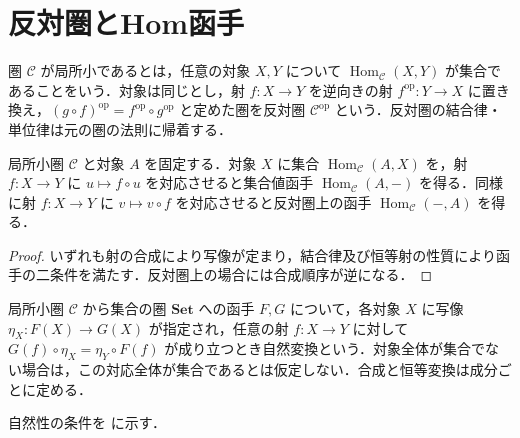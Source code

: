 \section{反対圏とHom函手}
\begin{defn}[局所小圏と反対圏]
圏 $\mathcal C$ が局所小であるとは，任意の対象 $X,Y$ について $\operatorname{Hom}_{\mathcal C}(X,Y)$ が集合であることをいう．対象は同じとし，射 $f:X\to Y$ を逆向きの射 $f^{\mathrm{op}}:Y\to X$ に置き換え，$(g\circ f)^{\mathrm{op}}=f^{\mathrm{op}}\circ g^{\mathrm{op}}$ と定めた圏を反対圏 $\mathcal C^{\mathrm{op}}$ という．反対圏の結合律・単位律は元の圏の法則に帰着する．
\end{defn}
\begin{prop}[Hom函手]
局所小圏 $\mathcal C$ と対象 $A$ を固定する．対象 $X$ に集合 $\operatorname{Hom}_{\mathcal C}(A,X)$ を，射 $f:X\to Y$ に $u\mapsto f\circ u$ を対応させると集合値函手 $\operatorname{Hom}_{\mathcal C}(A,-)$ を得る．同様に射 $f:X\to Y$ に $v\mapsto v\circ f$ を対応させると反対圏上の函手 $\operatorname{Hom}_{\mathcal C}(-,A)$ を得る．
\end{prop}
\begin{proof}
いずれも射の合成により写像が定まり，結合律及び恒等射の性質により函手の二条件を満たす．反対圏上の場合には合成順序が逆になる．
\end{proof}
\begin{defn}[集合値函手の自然変換]
局所小圏 $\mathcal C$ から集合の圏 $\mathbf{Set}$ への函手 $F,G$ について，各対象 $X$ に写像 $\eta_X:F(X)\to G(X)$ が指定され，任意の射 $f:X\to Y$ に対して $G(f)\circ\eta_X=\eta_Y\circ F(f)$ が成り立つとき自然変換という．対象全体が集合でない場合は，この対応全体が集合であるとは仮定しない．合成と恒等変換は成分ごとに定める．
\end{defn}
自然性の条件を  に示す．
